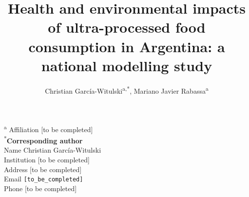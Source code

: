 \documentclass{article}
\title{Health and environmental impacts of ultra-processed food consumption in Argentina: a national modelling study \bigskip}
\author{Christian Garc\'ia-Witulski\textsuperscript{a,*}, Mariano Javier Rabassa\textsuperscript{a}}
\date{}
\begin{document}
\maketitle
\thispagestyle{empty}

\noindent\textsuperscript{a} Affiliation [to be completed]\\

\vspace{1.2cm}
\noindent\textsuperscript{*}\textbf{Corresponding author}\\
Name Christian Garc\'ia-Witulski\\
Institution [to be completed]\\
Address [to be completed]\\
Email \texttt{[to\_be\_completed]}\\
Phone [to be completed]

\onehalfspacing
\vspace{1.0cm}
\end{document}
